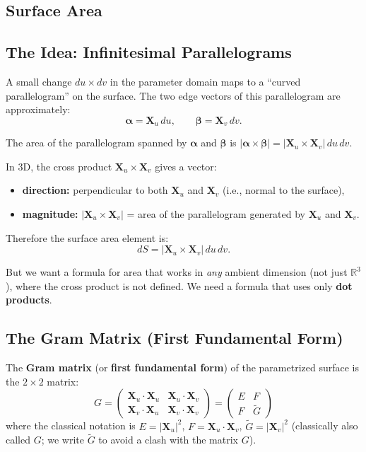 \documentclass[11pt]{report}
\newcommand{\R}{\mathbb{R}}
\begin{document}
\subsection{Surface Area}

\subsection*{The Idea: Infinitesimal Parallelograms}

A small change $du \times dv$ in the parameter domain maps to a ``curved parallelogram'' on the surface. The two edge vectors of this parallelogram are approximately:
\[
\boldsymbol{\alpha} = \mathbf{X}_u \, du, \qquad \boldsymbol{\beta} = \mathbf{X}_v \, dv.
\]

The area of the parallelogram spanned by $\boldsymbol{\alpha}$ and $\boldsymbol{\beta}$ is $|\boldsymbol{\alpha} \times \boldsymbol{\beta}| = |\mathbf{X}_u \times \mathbf{X}_v| \, du \, dv$.

In 3D, the cross product $\mathbf{X}_u \times \mathbf{X}_v$ gives a vector:
\begin{itemize}
    \item \textbf{direction:} perpendicular to both $\mathbf{X}_u$ and $\mathbf{X}_v$ (i.e., normal to the surface),
    \item \textbf{magnitude:} $|\mathbf{X}_u \times \mathbf{X}_v|$ = area of the parallelogram generated by $\mathbf{X}_u$ and $\mathbf{X}_v$.
\end{itemize}

Therefore the surface area element is:
\[
dS = |\mathbf{X}_u \times \mathbf{X}_v| \, du \, dv.
\]

But we want a formula for area that works in \textit{any} ambient dimension (not just $\R^3$), where the cross product is not defined. We need a formula that uses only \textbf{dot products}.

\subsection*{The Gram Matrix (First Fundamental Form)}

\begin{definition}
The \textbf{Gram matrix} (or \textbf{first fundamental form}) of the parametrized surface is the $2 \times 2$ matrix:
\[
G = \begin{pmatrix} \mathbf{X}_u \cdot \mathbf{X}_u & \mathbf{X}_u \cdot \mathbf{X}_v \\ \mathbf{X}_v \cdot \mathbf{X}_u & \mathbf{X}_v \cdot \mathbf{X}_v \end{pmatrix} = \begin{pmatrix} E & F \\ F & \tilde{G} \end{pmatrix}
\]
where the classical notation is $E = |\mathbf{X}_u|^2$, $F = \mathbf{X}_u \cdot \mathbf{X}_v$, $\tilde{G} = |\mathbf{X}_v|^2$ (classically also called $G$; we write $\tilde{G}$ to avoid a clash with the matrix $G$).
\end{definition}
\end{document}
